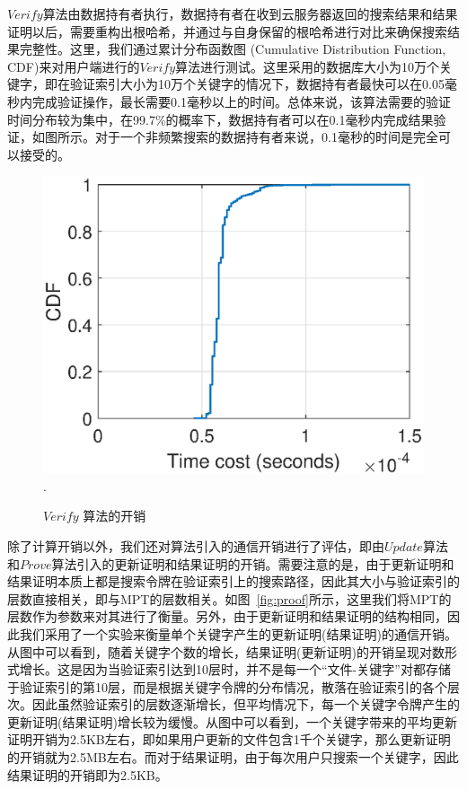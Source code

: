 $Verify$算法由数据持有者执行，数据持有者在收到云服务器返回的搜索结果和结果证明以后，需要重构出根哈希，并通过与自身保留的根哈希进行对比来确保搜索结果完整性。这里，我们通过累计分布函数图 (Cumulative Distribution Function, CDF)来对用户端进行的$Verify$算法进行测试。这里采用的数据库大小为10万个关键字，即在验证索引大小为10万个关键字的情况下，数据持有者最快可以在0.05毫秒内完成验证操作，最长需要0.1毫秒以上的时间。总体来说，该算法需要的验证时间分布较为集中，在99.7\%的概率下，数据持有者可以在0.1毫秒内完成结果验证，如图所示。对于一个非频繁搜索的数据持有者来说，0.1毫秒的时间是完全可以接受的。
\begin{figure}[h]
\centering
\includegraphics[width=3.5 in]{expr/verify}
\DeclareGraphicsExtensions.
\caption{$Verify$ 算法的开销}
\label{fig:verify}
\end{figure}

除了计算开销以外，我们还对算法引入的通信开销进行了评估，即由$Update$算法和$Prove$算法引入的更新证明和结果证明的开销。需要注意的是，由于更新证明和结果证明本质上都是搜索令牌在验证索引上的搜索路径，因此其大小与验证索引的层数直接相关，即与MPT的层数相关。如图~\ref{fig:proof}所示，这里我们将MPT的层数作为参数来对其进行了衡量。另外，由于更新证明和结果证明的结构相同，因此我们采用了一个实验来衡量单个关键字产生的更新证明(结果证明)的通信开销。从图中可以看到，随着关键字个数的增长，结果证明(更新证明)的开销呈现对数形式增长。这是因为当验证索引达到10层时，并不是每一个“文件-关键字”对都存储于验证索引的第10层，而是根据关键字令牌的分布情况，散落在验证索引的各个层次。因此虽然验证索引的层数逐渐增长，但平均情况下，每一个关键字令牌产生的更新证明(结果证明)增长较为缓慢。从图中可以看到，一个关键字带来的平均更新证明开销为2.5KB左右，即如果用户更新的文件包含1千个关键字，那么更新证明的开销就为2.5MB左右。而对于结果证明，由于每次用户只搜索一个关键字，因此结果证明的开销即为2.5KB。


